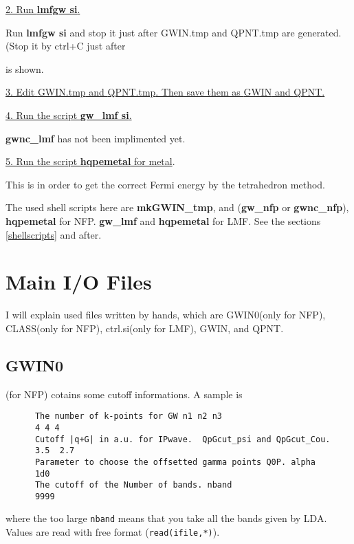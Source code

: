 \documentclass[a4paper,10pt,epsf,fleqn]{article}
\newcommand{\fx}[1]{\subsection{\sf #1\index{\sf #1}}}
\begin{document}
{{{\noindent\underline{\large 2. Run {\bf lmfgw si}.}

Run {\bf lmfgw si} and stop it just after {\sf GWIN.tmp} and {\sf QPNT.tmp} are generated. 
(Stop it by ctrl+C just after  

\hspace{1cm}{\tt Creating files SYMOPS, LATTC, EFCLASSin, GWIN0, GWIN.tmp, QPNT.tmp} 

is shown.

\noindent\underline{\large 3. Edit {\sf GWIN.tmp} and {\sf QPNT.tmp}.
Then save them as {\sf GWIN} and {\sf QPNT}. }

\noindent\underline{\large 4. Run the script {\bf gw\_lmf si}.}

{\bf gwnc\_lmf} has not been implimented yet.

\noindent\underline{\large 5. Run the script {\bf hqpemetal} for metal}.

This is in order to get the correct Fermi energy by the tetrahedron method.
}}


\vspace{0.5cm}
\vspace{1cm}
The used shell scripts here are 
{\bf mkGWIN\_tmp}, and ({\bf gw\_nfp} or {\bf gwnc\_nfp}),
{\bf hqpemetal} for NFP.  {\bf gw\_lmf} and {\bf hqpemetal} for LMF.
See the sections  \ref{shellscripts} and after.



\newpage
\section{Main I/O Files}

\noindent I will explain used files written by hands, which
are {\sf GWIN0}(only for NFP), {\sf CLASS}(only for NFP),
{\sf ctrl.si}(only for LMF), {\sf GWIN}, and {\sf QPNT}.

\fx{GWIN0}(for NFP) cotains some cutoff informations. A sample is 
{\baselineskip=2.6mm
\begin{verbatim}
      The number of k-points for GW n1 n2 n3
      4 4 4 
      Cutoff |q+G| in a.u. for IPwave.  QpGcut_psi and QpGcut_Cou.
      3.5  2.7
      Parameter to choose the offsetted gamma points Q0P. alpha
      1d0
      The cutoff of the Number of bands. nband
      9999
\end{verbatim}}
where the too large {\tt nband} means that you take all the bands given by LDA. 
Values are read with free format ({\tt read(ifile,*)}).

}
\end{document}
